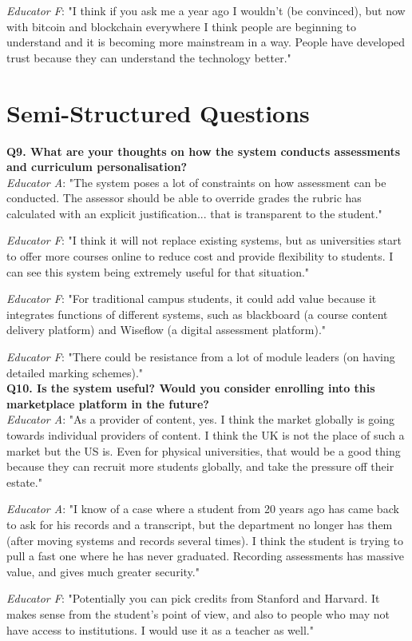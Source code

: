 \textit{Educator F}: "I think if you ask me a year ago I wouldn't (be convinced), but now with bitcoin and
blockchain everywhere I think people are beginning to understand and it is becoming more mainstream in a way.
People have developed trust because they can understand the technology better."\\

\section{Semi-Structured Questions}

\textbf{Q9. What are your thoughts on how the system conducts assessments and curriculum personalisation?}\\

\textit{Educator A}: "The system poses a lot of constraints on how assessment can be conducted.
The assessor should be able to override grades the rubric has calculated with an explicit justification...
that is transparent to the student."

\textit{Educator F}: "I think it will not replace existing systems, but as universities start to offer more 
courses online to reduce cost and provide flexibility to students. I can see this system being extremely useful 
for that situation."

\textit{Educator F}: "For traditional campus students, it could add value because it integrates functions of different systems, 
such as blackboard (a course content delivery platform) and Wiseflow (a digital assessment platform)."

\textit{Educator F}: "There could be resistance from a lot of module leaders (on having detailed marking schemes)."\\

\textbf{Q10. Is the system useful? Would you consider enrolling into this marketplace platform in the future?}\\

\textit{Educator A}: "As a provider of content, yes. I think the market globally is going towards
individual providers of content. I think the UK is not the place of such a market but the US is.
Even for physical universities, that would be a good thing because they can recruit more students globally, and
take the pressure off their estate."

\textit{Educator A}: "I know of a case where a student from 20 years ago has came back to ask for his records
and a transcript, but the department no longer has them (after moving systems and records several times).
I think the student is trying to pull a fast one where he has never graduated. Recording assessments has massive value,
and gives much greater security."

\textit{Educator F}: "Potentially you can pick credits from Stanford and Harvard. 
It makes sense from the student's point of view, and also to people who may not have access to institutions. 
I would use it as a teacher as well."